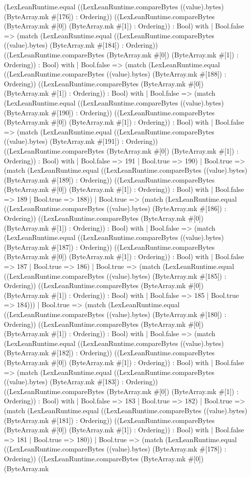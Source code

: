 \documentclass[11pt]{article}
\begin{document}
(LexLeanRuntime.equal ((LexLeanRuntime.compareBytes ((value).bytes) (ByteArray.mk \#[176]) : Ordering)) ((LexLeanRuntime.compareBytes (ByteArray.mk \#[0]) (ByteArray.mk \#[1]) : Ordering)) : Bool) with | Bool.false => (match (LexLeanRuntime.equal ((LexLeanRuntime.compareBytes ((value).bytes) (ByteArray.mk \#[184]) : Ordering)) ((LexLeanRuntime.compareBytes (ByteArray.mk \#[0]) (ByteArray.mk \#[1]) : Ordering)) : Bool) with | Bool.false => (match (LexLeanRuntime.equal ((LexLeanRuntime.compareBytes ((value).bytes) (ByteArray.mk \#[188]) : Ordering)) ((LexLeanRuntime.compareBytes (ByteArray.mk \#[0]) (ByteArray.mk \#[1]) : Ordering)) : Bool) with | Bool.false => (match (LexLeanRuntime.equal ((LexLeanRuntime.compareBytes ((value).bytes) (ByteArray.mk \#[190]) : Ordering)) ((LexLeanRuntime.compareBytes (ByteArray.mk \#[0]) (ByteArray.mk \#[1]) : Ordering)) : Bool) with | Bool.false => (match (LexLeanRuntime.equal ((LexLeanRuntime.compareBytes ((value).bytes) (ByteArray.mk \#[191]) : Ordering)) ((LexLeanRuntime.compareBytes (ByteArray.mk \#[0]) (ByteArray.mk \#[1]) : Ordering)) : Bool) with | Bool.false => 191 | Bool.true => 190) | Bool.true => (match (LexLeanRuntime.equal ((LexLeanRuntime.compareBytes ((value).bytes) (ByteArray.mk \#[189]) : Ordering)) ((LexLeanRuntime.compareBytes (ByteArray.mk \#[0]) (ByteArray.mk \#[1]) : Ordering)) : Bool) with | Bool.false => 189 | Bool.true => 188)) | Bool.true => (match (LexLeanRuntime.equal ((LexLeanRuntime.compareBytes ((value).bytes) (ByteArray.mk \#[186]) : Ordering)) ((LexLeanRuntime.compareBytes (ByteArray.mk \#[0]) (ByteArray.mk \#[1]) : Ordering)) : Bool) with | Bool.false => (match (LexLeanRuntime.equal ((LexLeanRuntime.compareBytes ((value).bytes) (ByteArray.mk \#[187]) : Ordering)) ((LexLeanRuntime.compareBytes (ByteArray.mk \#[0]) (ByteArray.mk \#[1]) : Ordering)) : Bool) with | Bool.false => 187 | Bool.true => 186) | Bool.true => (match (LexLeanRuntime.equal ((LexLeanRuntime.compareBytes ((value).bytes) (ByteArray.mk \#[185]) : Ordering)) ((LexLeanRuntime.compareBytes (ByteArray.mk \#[0]) (ByteArray.mk \#[1]) : Ordering)) : Bool) with | Bool.false => 185 | Bool.true => 184))) | Bool.true => (match (LexLeanRuntime.equal ((LexLeanRuntime.compareBytes ((value).bytes) (ByteArray.mk \#[180]) : Ordering)) ((LexLeanRuntime.compareBytes (ByteArray.mk \#[0]) (ByteArray.mk \#[1]) : Ordering)) : Bool) with | Bool.false => (match (LexLeanRuntime.equal ((LexLeanRuntime.compareBytes ((value).bytes) (ByteArray.mk \#[182]) : Ordering)) ((LexLeanRuntime.compareBytes (ByteArray.mk \#[0]) (ByteArray.mk \#[1]) : Ordering)) : Bool) with | Bool.false => (match (LexLeanRuntime.equal ((LexLeanRuntime.compareBytes ((value).bytes) (ByteArray.mk \#[183]) : Ordering)) ((LexLeanRuntime.compareBytes (ByteArray.mk \#[0]) (ByteArray.mk \#[1]) : Ordering)) : Bool) with | Bool.false => 183 | Bool.true => 182) | Bool.true => (match (LexLeanRuntime.equal ((LexLeanRuntime.compareBytes ((value).bytes) (ByteArray.mk \#[181]) : Ordering)) ((LexLeanRuntime.compareBytes (ByteArray.mk \#[0]) (ByteArray.mk \#[1]) : Ordering)) : Bool) with | Bool.false => 181 | Bool.true => 180)) | Bool.true => (match (LexLeanRuntime.equal ((LexLeanRuntime.compareBytes ((value).bytes) (ByteArray.mk \#[178]) : Ordering)) ((LexLeanRuntime.compareBytes (ByteArray.mk \#[0]) (ByteArray.mk 
\end{document}
